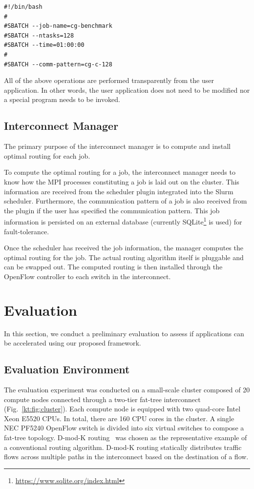 \documentclass[graybox]{svmult}
\begin{document}
\begin{lstlisting}[float,caption=An example of a job script,label=kt:lst:script]
#!/bin/bash
#
#SBATCH --job-name=cg-benchmark
#SBATCH --ntasks=128
#SBATCH --time=01:00:00
#
#SBATCH --comm-pattern=cg-c-128
\end{lstlisting}

All of the above operations are performed transparently from the user
application. In other words, the user application does not need to be modified
nor a special program needs to be invoked.

\subsection{Interconnect Manager}

The primary purpose of the interconnect manager is to compute and install
optimal routing for each job.

To compute the optimal routing for a job, the interconnect manager needs to
know how the MPI processes constituting a job is laid out on the cluster.
This information are received from the scheduler plugin integrated into the
Slurm scheduler. Furthermore, the communication pattern of a job is also
received from the plugin if the user has specified the communication pattern.
This job information is persisted on an external database (currently
SQLite\footnote{\url{https://www.sqlite.org/index.html}} is used) for
fault-tolerance.

Once the scheduler has received the job information, the manager computes the
optimal routing for the job. The actual routing algorithm itself is pluggable
and can be swapped out. The computed routing is then installed through the
OpenFlow controller to each switch in the interconnect.

\section{Evaluation}\label{kt:sec:iv}

In this section, we conduct a preliminary evaluation to assess if applications
can be accelerated using our proposed framework.

\subsection{Evaluation Environment}

The evaluation experiment was conducted on a small-scale cluster composed of
20 compute nodes connected through a two-tier fat-tree interconnect
(Fig.~\ref{kt:fig:cluster}). Each compute node is equipped with two quad-core
Intel Xeon E5520 CPUs. In total, there are 160 CPU cores in the cluster. A
single NEC PF5240 OpenFlow switch is divided into six virtual switches to
compose a fat-tree topology. D-mod-K routing~\cite{Rodriguez2009} was chosen
as the representative example of a conventional routing algorithm. D-mod-K
routing statically distributes traffic flows across multiple paths in the
interconnect based on the destination of a flow.
\end{document}

